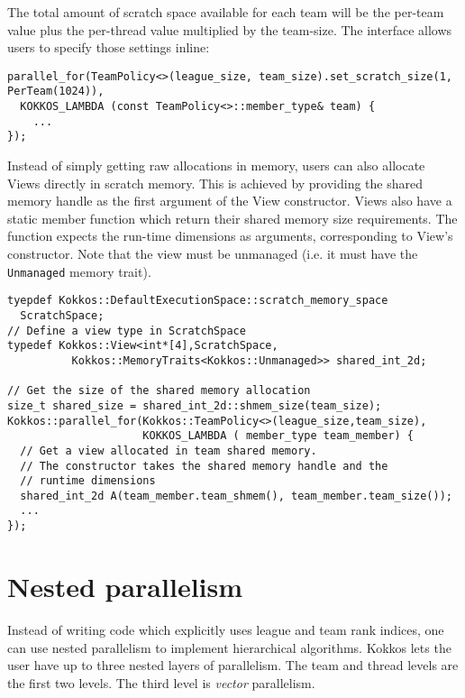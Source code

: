 The total amount of scratch space available for each team will be the per-team value plus the per-thread value multiplied by the team-size. 
The interface allows users to specify those settings inline:
\begin{lstlisting}
parallel_for(TeamPolicy<>(league_size, team_size).set_scratch_size(1, PerTeam(1024)),
  KOKKOS_LAMBDA (const TeamPolicy<>::member_type& team) {
    ...
});
\end{lstlisting}

Instead of simply getting raw allocations in memory, users can also allocate Views directly in scratch memory. 
This is achieved by providing the shared memory handle as the first argument of the View constructor.
Views also have a static member function which return their shared memory size requirements. 
The function expects the run-time dimensions as arguments, corresponding to View's constructor. 
Note that the view must be unmanaged (i.e. it must have the \lstinline|Unmanaged| memory trait).

\begin{lstlisting}
tyepdef Kokkos::DefaultExecutionSpace::scratch_memory_space
  ScratchSpace;
// Define a view type in ScratchSpace
typedef Kokkos::View<int*[4],ScratchSpace,
          Kokkos::MemoryTraits<Kokkos::Unmanaged>> shared_int_2d;

// Get the size of the shared memory allocation
size_t shared_size = shared_int_2d::shmem_size(team_size);
Kokkos::parallel_for(Kokkos::TeamPolicy<>(league_size,team_size),
                     KOKKOS_LAMBDA ( member_type team_member) {
  // Get a view allocated in team shared memory.
  // The constructor takes the shared memory handle and the 
  // runtime dimensions
  shared_int_2d A(team_member.team_shmem(), team_member.team_size());
  ...  
});
\end{lstlisting}

\section{Nested parallelism}\label{S:Hierarchical:Nested}

Instead of writing code which explicitly uses league and team rank indices, one can use nested parallelism to implement hierarchical algorithms.
Kokkos lets the user have up to three nested layers of parallelism.
The team and thread levels are the first two levels.
The third level is \emph{vector} parallelism.

